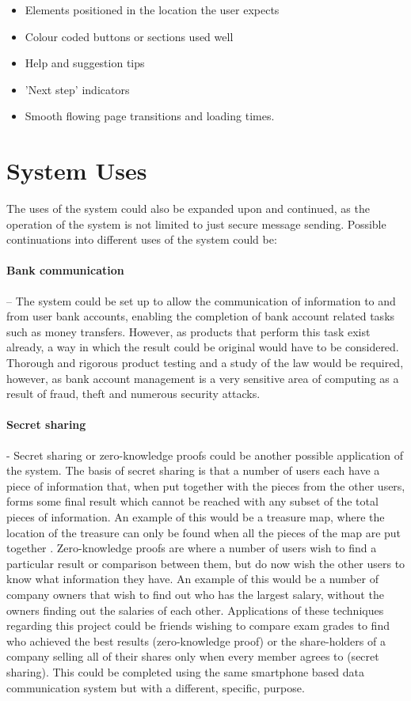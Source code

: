 \documentclass[a4paper,12pt]{report}
\begin{document}
\begin{itemize}
 \item Elements positioned in the location the user expects 
 \item Colour coded buttons or sections used well
 \item Help and suggestion tips
 \item 'Next step' indicators
 \item Smooth flowing page transitions and loading times.
\end{itemize}
 
\section{System Uses}

The uses of the system could also be expanded upon and continued, as the operation of the system is not limited to just secure message sending. Possible continuations into different uses of the system could be:

\paragraph{Bank communication} – The system could be set up to allow the communication of information to and from user bank accounts, enabling the completion of bank account related tasks such as money transfers. However, as products that perform this task exist already, a way in which the result could be original would have to be considered. Thorough and rigorous product testing and a study of the law would be required, however, as bank account management is a very sensitive area of computing as a result of fraud, theft and numerous security attacks. 

\paragraph{Secret sharing} - Secret sharing or zero-knowledge proofs could be another possible application of the system. The basis of secret sharing is that a number of users each have a piece of information that, when put together with the pieces from the other users, forms some final result which cannot be reached with any subset of the total pieces of information. An example of this would be a treasure map, where the location of the treasure can only be found when all the pieces of the map are put together \cite{bertholdvocking}. Zero-knowledge proofs are where a number of users wish to find a particular result or comparison between them, but do now wish the other users to know what information they have. An example of this would be a number of company owners that wish to find out who has the largest salary, without the owners finding out the salaries of each other. Applications of these techniques regarding this project could be friends wishing to compare exam grades to find who achieved the best results (zero-knowledge proof) or the share-holders of a company selling all of their shares only when every member agrees to (secret sharing). This could be completed using the same smartphone based data communication system but with a different, specific, purpose.
\end{document}
